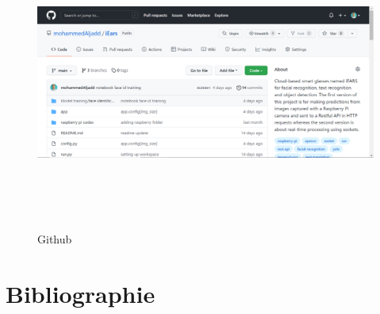 {\begin{center}
\begin{figure}[h]
\centering
\includegraphics[width=18cm, height=9cm]{4-Images/github.PNG}\\[2cm]
\caption{Github}
\label{fig:figure2}
\end{figure}
\Large

\end{center}


\pagebreak
{}
\chapter*{Bibliographie}
\printbibliography 

}